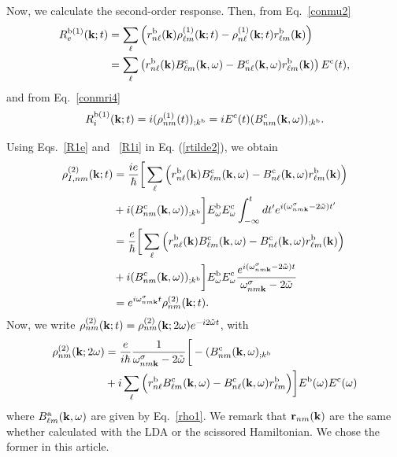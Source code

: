 \documentclass[floatfix,prb,aps,superscriptaddress,11pt,preprint,letterpaper]{revtex4}
\begin{document}
Now, we calculate the second-order response. Then, from Eq.~\eqref{conmu2}
\begin{align}\label{R1e}
R_e^{\mathrm{b}(1)}(\mathbf{k};t)
&=
\sum_{\ell}
\left(
r^{\mathrm{b}}_{n\ell}(\mathbf{k})
{\rho}^{(1)}_{\ell m}(\mathbf{k};t)
-
{\rho}^{(1)}_{n\ell}(\mathbf{k};t)
r^{\mathrm{b}}_{\ell m}(\mathbf{k})
\right)
\nonumber \\
&=
\sum_{\ell}
\left(
r^{\mathrm{b}}_{n\ell}(\mathbf{k})
B^{\mathrm{c}}_{\ell m}(\mathbf{k},\omega)
-
B^{\mathrm{c}}_{n\ell}(\mathbf{k},\omega)
r^{\mathrm{b}}_{\ell m}(\mathbf{k})
\right)E^{\mathrm{c}}(t)
,
\end{align}
and from Eq.~\eqref{conmri4}
\begin{equation}\label{R1i}
R_i^{\mathrm{b}(1)}(\mathbf{k};t)=
i(\rho^{(1)}_{nm}(t))_{;k^{\mathrm{b}}}=
iE^{\mathrm{c}}(t)(B^{\mathrm{c}}_{nm}(\mathbf{k},\omega))_{;k^{\mathrm{b}}}
.
\end{equation}

Using Eqs.~\eqref{R1e} and ~\eqref{R1i} in Eq. (\ref{rtilde2}),
we obtain
\begin{align}\label{rtilde33}
{\rho}^{(2)}_{I,nm}(\mathbf{k};t)
&=
\frac{ie}{\hbar}
\bigg[
\sum_{\ell}
\Big(
r^{\mathrm{b}}_{n\ell}(\mathbf{k})
B^{\mathrm{c}}_{\ell m}(\mathbf{k},\omega)
-
B^{\mathrm{c}}_{n\ell}(\mathbf{k},\omega)
r^{\mathrm{b}}_{\ell m}(\mathbf{k})
\Big)
\nonumber \\
&+
i
(B^{\mathrm{c}}_{nm}(\mathbf{k},\omega))_{;k^{\mathrm{b}}}
\bigg]
E^{\mathrm{b}}_{\omega}E_{\omega}^{\mathrm{c}}
\int_{-\infty}^t dt'
e^{i(\omega^\sigma_{nm\mathbf{k}}-2\tilde\omega)t'}
\nonumber \\
&=
\frac{e}{\hbar}
\bigg[
\sum_{\ell}
\Big(
r^{\mathrm{b}}_{n\ell}(\mathbf{k})
B^{\mathrm{c}}_{\ell m}(\mathbf{k},\omega)
-
B^{\mathrm{c}}_{n\ell}(\mathbf{k},\omega)
r^{\mathrm{b}}_{\ell m}(\mathbf{k})
\Big)
\nonumber \\
&+
i
(B^{\mathrm{c}}_{nm}(\mathbf{k},\omega))_{;k^{\mathrm{b}}}
\bigg]
E^{\mathrm{b}}_{\omega}E_{\omega}^{\mathrm{c}}
\frac{e^{i(\omega^\sigma_{nm\mathbf{k}}-2\tilde\omega)t}}
{\omega^\sigma_{nm\mathbf{k}}-2\tilde\omega}
\nonumber \\
&=
e^{i\omega^\sigma_{nm\mathbf{k}}t}
\rho_{nm}^{(2)}(\mathbf{k};t)
.
\end{align}
Now, we write
$\rho_{nm}^{(2)}(\mathbf{k};t)=\rho_{nm}^{(2)}(\mathbf{k};2\omega)e^{-i2\tilde\omega t}$,
with
\begin{align}\label{rho2}
{\rho}_{nm}^{(2)}(\mathbf{k};2\omega)&=\frac{e}{i\hbar}\frac{1}{\omega^\sigma_{nm\mathbf{k}}-2\tilde\omega}
\bigg[-(B_{nm}^{\mathrm{c}}(\mathbf{k},\omega)_{;k^{\mathrm{b}}}
\nonumber \\
&
+i\sum_\ell\Big(r_{n\ell}^{\mathrm{b}}B_{\ell m}^{\mathrm{c}}(\mathbf{k},\omega) - B_{n\ell}^{\mathrm{c}}(\mathbf{k},\omega)
  r_{\ell m}^{\mathrm{b}}\Big)
\bigg] 
E^{\mathrm{b}}(\omega)E^{\mathrm{c}}(\omega)
\end{align} 
where 
$B_{\ell m}^{\mathrm{a}}(\mathbf{k},\omega)$ are given by Eq.~\eqref{rho1}. 
We remark that $\mathbf{r}_{nm}(\mathbf{k})$  are
the same whether calculated with the LDA or the scissored Hamiltonian. 
We chose the former in this article.
\end{document}
